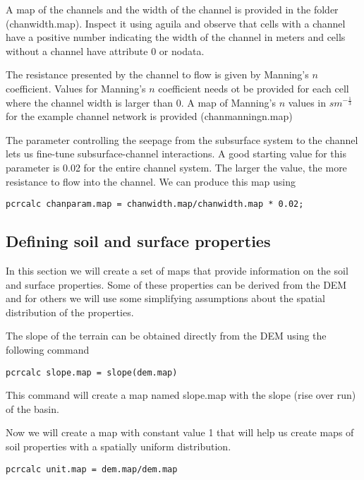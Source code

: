 A map of the channels and the width of the channel is provided in the folder (\textsf{chanwidth.map}). Inspect it using aguila and observe that cells with a channel have a positive number indicating the width of the channel in meters and cells without a channel have attribute 0 or nodata.

The resistance presented by the channel to flow is given by Manning's $n$ coefficient. Values for Manning's $n$ coefficient needs ot be provided for each cell where the channel width is larger than 0. A map of Manning's $n$ values in $sm^{-\frac{1}{3}}$ for the example channel network is provided (\textsf{chanmanningn.map})

The parameter controlling the seepage from the subsurface system to the channel lets us fine-tune subsurface-channel interactions. A good starting value for this parameter is 0.02 for the entire channel system. The larger the value, the more resistance to flow into the channel. We can produce this map using 

\begin{verbatim}
pcrcalc chanparam.map = chanwidth.map/chanwidth.map * 0.02;
\end{verbatim}

\subsection{Defining soil and surface properties}

In this section we will create a set of maps that provide information on the soil and surface properties. Some of these properties can be derived from the DEM and for others we will use some simplifying assumptions about the spatial distribution of the properties.

The slope of the terrain can be obtained directly from the DEM using the following command 

\begin{verbatim}
pcrcalc slope.map = slope(dem.map)
\end{verbatim}

This command will create a map named \textsf{slope.map} with the slope (rise over run) of the basin.

Now we will create a map with constant value 1 that will help us create maps of soil properties with a spatially uniform distribution.  

\begin{verbatim}
pcrcalc unit.map = dem.map/dem.map
\end{verbatim}

